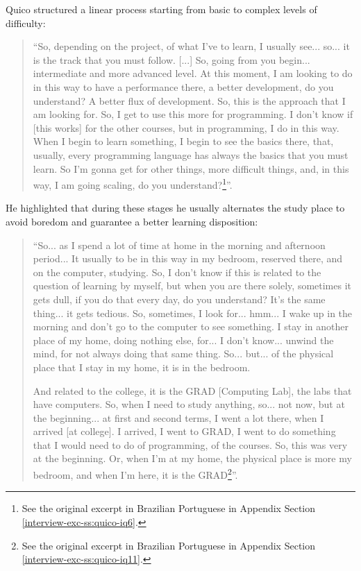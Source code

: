 Quico structured a linear process starting from basic to complex levels of difficulty:
\begin{quote}
    “So, depending on the project, of what I've to learn, I usually see... so... it is the track that you must follow. [...] So, going from you begin... intermediate and more advanced level. At this moment, I am looking to do in this way to have a performance there, a better development, do you understand? A better flux of development. So, this is the approach that I am looking for. So, I get to use this more for programming. I don't know if [this works] for the other courses, but in programming, I do in this way. When I begin to learn something, I begin to see the basics there, that, usually, every programming language has always the basics that you must learn. So I'm gonna get for other things, more difficult things, and, in this way, I am going scaling, do you understand?\footnote{See the original excerpt in Brazilian Portuguese in Appendix Section \ref{interview-exc-ss:quico-iq6}.}”.    
\end{quote}
He highlighted that during these stages he usually alternates the study place to avoid boredom and guarantee a better learning disposition:
\begin{quote}
    “So... as I spend a lot of time at home in the morning and afternoon period... It usually to be in this way in my bedroom, reserved there, and on the computer, studying. So, I don't know if this is related to the question of learning by myself, but when you are there solely, sometimes it gets dull, if you do that every day, do you understand? It's the same thing... it gets tedious. So, sometimes, I look for... hmm... I wake up in the morning and don't go to the computer to see something. I stay in another place of my home, doing nothing else, for... I don't know... unwind the mind, for not always doing that same thing. So... but... of the physical place that I stay in my home, it is in the bedroom.

    And related to the college, it is the GRAD [Computing Lab], the labs that have computers. So, when I need to study anything, so... not now, but at the beginning... at first and second terms, I went a lot there, when I arrived [at college]. I arrived, I went to GRAD, I went to do something that I would need to do of programming, of the courses. So, this was very at the beginning. Or, when I'm at my home, the physical place is more my bedroom, and when I'm here, it is the GRAD\footnote{See the original excerpt in Brazilian Portuguese in Appendix Section \ref{interview-exc-ss:quico-iq11}.}”.
\end{quote}

